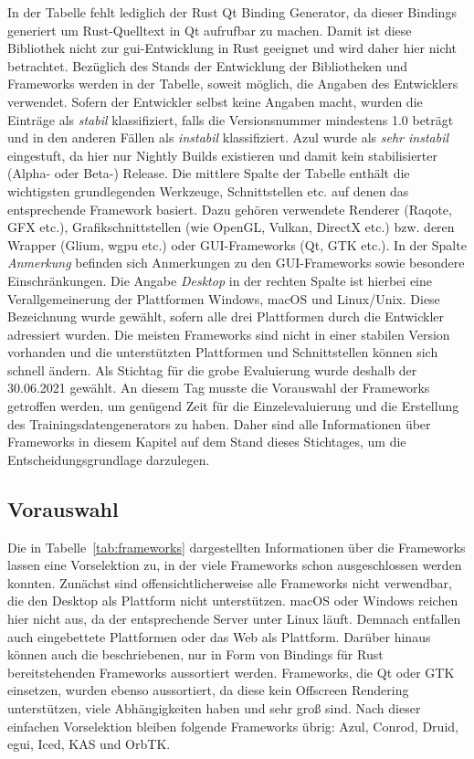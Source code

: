 In der Tabelle fehlt lediglich der Rust Qt Binding Generator, da dieser Bindings generiert um Rust-Quelltext in Qt aufrufbar zu machen. Damit ist diese Bibliothek nicht zur \gls{gui}-Entwicklung in Rust geeignet und wird daher hier nicht betrachtet. Bezüglich des Stands der Entwicklung der Bibliotheken und Frameworks werden in der Tabelle, soweit möglich, die Angaben des Entwicklers verwendet. Sofern der Entwickler selbst keine Angaben macht, wurden die Einträge als \emph{stabil} klassifiziert, falls die Versionsnummer mindestens 1.0 beträgt und in den anderen Fällen als \emph{instabil} klassifiziert. Azul wurde als \emph{sehr instabil} eingestuft, da hier nur Nightly Builds existieren und damit kein stabilisierter (Alpha- oder Beta-) Release.
Die mittlere Spalte der Tabelle enthält die wichtigsten grundlegenden Werkzeuge, Schnittstellen etc. auf denen das entsprechende Framework basiert. Dazu gehören verwendete Renderer (Raqote, GFX etc.), Grafikschnittstellen (wie OpenGL, Vulkan, DirectX etc.) bzw. deren Wrapper (Glium, wgpu etc.) oder GUI-Frameworks (Qt, GTK etc.). In der Spalte \emph{Anmerkung} befinden sich Anmerkungen zu den GUI-Frameworks sowie besondere Einschränkungen. Die Angabe \emph{Desktop} in der rechten Spalte ist hierbei eine Verallgemeinerung der Plattformen Windows, macOS und Linux/Unix. Diese Bezeichnung wurde gewählt, sofern alle drei Plattformen durch die Entwickler adressiert wurden. Die meisten Frameworks sind nicht in einer stabilen Version vorhanden und die unterstützten Plattformen und Schnittstellen können sich schnell ändern. Als Stichtag für die grobe Evaluierung wurde deshalb der 30.06.2021 gewählt. An diesem Tag musste die Vorauswahl der Frameworks getroffen werden, um genügend Zeit für die Einzelevaluierung und die Erstellung des Trainingsdatengenerators zu haben. Daher sind alle Informationen über Frameworks in diesem Kapitel auf dem Stand dieses Stichtages, um die Entscheidungsgrundlage darzulegen.


\subsection{Vorauswahl}

Die in Tabelle~\ref{tab:frameworks} dargestellten Informationen über die Frameworks lassen eine Vorselektion zu, in der viele Frameworks schon ausgeschlossen werden konnten. Zunächst sind offensichtlicherweise alle Frameworks nicht verwendbar, die den Desktop als Plattform nicht unterstützen. macOS oder Windows reichen hier nicht aus, da der entsprechende Server unter Linux läuft. Demnach entfallen auch eingebettete Plattformen oder das Web als Plattform. Darüber hinaus können auch die beschriebenen, nur in Form von Bindings für Rust bereitstehenden Frameworks aussortiert werden. Frameworks, die Qt oder GTK einsetzen, wurden ebenso aussortiert, da diese kein Offscreen Rendering
unterstützen, viele Abhängigkeiten haben und sehr groß sind. Nach dieser einfachen Vorselektion bleiben folgende Frameworks übrig: Azul, Conrod, Druid, egui, Iced, KAS und OrbTK.

